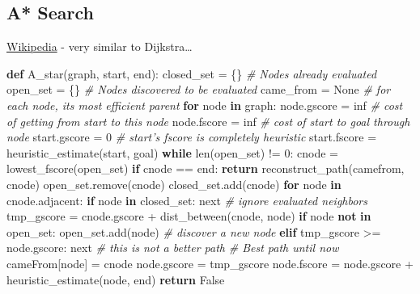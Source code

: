 \documentclass[12pt]{article}
\newenvironment{Shaded}{}{}
\newcommand{\KeywordTok}[1]{\textcolor[rgb]{0.00,0.44,0.13}{\textbf{{#1}}}}
\newcommand{\DecValTok}[1]{\textcolor[rgb]{0.25,0.63,0.44}{{#1}}}
\newcommand{\CommentTok}[1]{\textcolor[rgb]{0.38,0.63,0.69}{\textit{{#1}}}}
\newcommand{\NormalTok}[1]{{#1}}
\newcommand{\VariableTok}[1]{\textcolor[rgb]{0.10,0.09,0.49}{{#1}}}
\newcommand{\ControlFlowTok}[1]{\textcolor[rgb]{0.00,0.44,0.13}{\textbf{{#1}}}}
\newcommand{\OperatorTok}[1]{\textcolor[rgb]{0.40,0.40,0.40}{{#1}}}
\newcommand{\BuiltInTok}[1]{{#1}}
\begin{document}
    \subsection{A* Search}\label{a-search}

\href{https://en.wikipedia.org/wiki/A*_search_algorithm}{Wikipedia} -
very similar to Dijkstra\ldots{}

\begin{Shaded}
\begin{Highlighting}[]
\KeywordTok{def} \NormalTok{A_star(graph, start, end):}
  \NormalTok{closed_set }\OperatorTok{=} \NormalTok{\{\}  }\CommentTok{# Nodes already evaluated}
  \NormalTok{open_set }\OperatorTok{=} \NormalTok{\{\}  }\CommentTok{# Nodes discovered to be evaluated}
  \NormalTok{came_from }\OperatorTok{=} \VariableTok{None}  \CommentTok{# for each node, its most efficient parent}
  \ControlFlowTok{for} \NormalTok{node }\KeywordTok{in} \NormalTok{graph:}
    \NormalTok{node.gscore }\OperatorTok{=} \NormalTok{inf  }\CommentTok{# cost of getting from start to this node}
    \NormalTok{node.fscore }\OperatorTok{=} \NormalTok{inf  }\CommentTok{# cost of start to goal through node}
  \NormalTok{start.gscore }\OperatorTok{=} \DecValTok{0}
  \CommentTok{# start's fscore is completely heuristic}
  \NormalTok{start.fscore }\OperatorTok{=} \NormalTok{heuristic_estimate(start, goal)}
  \ControlFlowTok{while} \BuiltInTok{len}\NormalTok{(open_set) }\OperatorTok{!=} \DecValTok{0}\NormalTok{:}
    \NormalTok{cnode }\OperatorTok{=} \NormalTok{lowest_fscore(open_set)}
    \ControlFlowTok{if} \NormalTok{cnode }\OperatorTok{==} \NormalTok{end:}
      \ControlFlowTok{return} \NormalTok{reconstruct_path(camefrom, cnode)}
    \NormalTok{open_set.remove(cnode)}
    \NormalTok{closed_set.add(cnode)}
    \ControlFlowTok{for} \NormalTok{node }\KeywordTok{in} \NormalTok{cnode.adjacent:}
      \ControlFlowTok{if} \NormalTok{node }\KeywordTok{in} \NormalTok{closed_set:}
        \BuiltInTok{next} \CommentTok{# ignore evaluated neighbors}
      \NormalTok{tmp_gscore }\OperatorTok{=} \NormalTok{cnode.gscore }\OperatorTok{+} \NormalTok{dist_between(cnode, node)}
      \ControlFlowTok{if} \NormalTok{node }\KeywordTok{not} \KeywordTok{in} \NormalTok{open_set:}
        \NormalTok{open_set.add(node) }\CommentTok{# discover a new node}
      \ControlFlowTok{elif} \NormalTok{tmp_gscore }\OperatorTok{>=} \NormalTok{node.gscore:}
        \BuiltInTok{next} \CommentTok{# this is not a better path}
      \CommentTok{# Best path until now}
      \NormalTok{cameFrom[node] }\OperatorTok{=} \NormalTok{cnode}
      \NormalTok{node.gscore }\OperatorTok{=} \NormalTok{tmp_gscore}
      \NormalTok{node.fscore }\OperatorTok{=} \NormalTok{node.gscore }\OperatorTok{+} \NormalTok{heuristic_estimate(node, end)}
  \ControlFlowTok{return} \VariableTok{False}
  

\end{Highlighting}
\end{Shaded}
\end{document}
